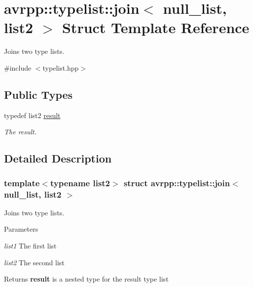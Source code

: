 \hypertarget{structavrpp_1_1typelist_1_1join_3_01null__list_00_01list2_01_4}{
\section{avrpp::typelist::join$<$ null\_\-list, list2 $>$ Struct Template Reference}
\label{structavrpp_1_1typelist_1_1join_3_01null__list_00_01list2_01_4}
}


Joins two type lists.  




{\ttfamily \#include $<$typelist.hpp$>$}

\subsection*{Public Types}
\begin{DoxyCompactItemize}
\item 
typedef list2 \hyperlink{structavrpp_1_1typelist_1_1join_3_01null__list_00_01list2_01_4_af412da0ee738464f73d716d4b1cc09db}{result}
\begin{DoxyCompactList}\small\item\em The result. \item\end{DoxyCompactList}\end{DoxyCompactItemize}


\subsection{Detailed Description}
\subsubsection*{template$<$typename list2$>$ struct avrpp::typelist::join$<$ null\_\-list, list2 $>$}

Joins two type lists. 
\begin{DoxyParams}{Parameters}
\item[{\em list1}]The first list \item[{\em list2}]The second list \end{DoxyParams}
\begin{DoxyReturn}{Returns}
{\bfseries result} is a nested type for the result type list 
\end{DoxyReturn}


